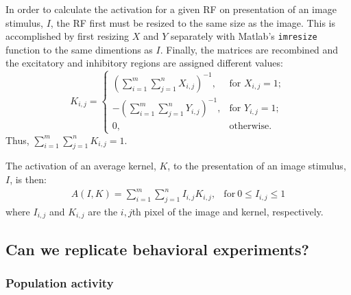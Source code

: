 In order to calculate the activation for a given \ac{RF} on presentation of an image stimulus, $I$, the \ac{RF} first must be resized to the same size as the image.
This is accomplished by first resizing $X$ and $Y$ separately with Matlab's \texttt{imresize} function to the same dimentions as $I$.
Finally, the matrices are recombined and the excitatory and inhibitory regions are assigned different values:
$$
K_{i,j} = \left\{
\begin{array}{rl}
\left( \sum\limits^m_{i=1}\sum\limits^n_{j=1}X_{i,j} \right)^{-1}, & \mbox{for } X_{i,j} = 1; \\
-\left( \sum\limits^m_{i=1}\sum\limits^n_{j=1}Y_{i,j} \right)^{-1}, & \mbox{for } Y_{i,j} = 1; \\
0, & \mbox{otherwise.}
\end{array}
\right.
$$
Thus, $\sum\limits_{i=1}^m \sum\limits_{j=1}^n K_{i,j}=1$.

\begin{comment}
The total numbers of excitatory, $N_{\mathrm{exc}}$, and inhibitory values, $N_{\mathrm{inh}}$, for the average kernel are then calculated:
\begin{align*}
N_{\mathrm{exc}} &= \sum\limits_{i=1}^m \sum\limits_{j=1}^n [K_{i,j} = 1] \\
N_{\mathrm{inh}} &= \sum\limits_{i=1}^m \sum\limits_{j=1}^n [K_{i,j} = -1]
\end{align*}
\end{comment}

The activation of an average kernel, $K$, to the presentation of an image stimulus, $I$, is then:
$$
\begin{array}{rl}
A(I,K) = {\sum\limits^m_{i=1} \sum\limits^n_{j=1} I_{i,j}K_{i,j}}, &\mathrm{for\ } 0 \le I_{i,j} \le 1
\end{array}
$$
where $I_{i,j}$ and $K_{i,j}$ are the $i,j$th pixel of the image and kernel, respectively. %



\subsection{Can we replicate behavioral experiments?}

\subsubsection{Population activity}


